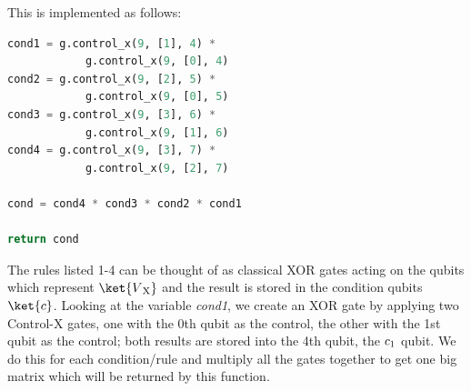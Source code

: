 \documentclass{article}
\begin{document}
This is implemented as follows:

\begin{file}
\begin{lstlisting}[language=Python]
cond1 = g.control_x(9, [1], 4) * 
            g.control_x(9, [0], 4)
cond2 = g.control_x(9, [2], 5) * 
            g.control_x(9, [0], 5)
cond3 = g.control_x(9, [3], 6) * 
            g.control_x(9, [1], 6)
cond4 = g.control_x(9, [3], 7) * 
            g.control_x(9, [2], 7)

cond = cond4 * cond3 * cond2 * cond1

return cond
\end{lstlisting}
\end{file}

The rules listed 1-4 can be thought of as classical XOR gates acting on the qubits which represent $\ket{V\textsubscript{X}}$ and the result is stored in the condition qubits $\ket{c}$. Looking at the variable \textit{cond1}, we create an XOR gate by applying two Control-X gates, one with the 0th qubit as the control, the other with the 1st qubit as the control; both results are stored into the 4th qubit, the $c\textsubscript{1}$ qubit. 
We do this for each condition/rule and multiply all the gates together to get one big matrix which will be returned by this function.
\end{document}

